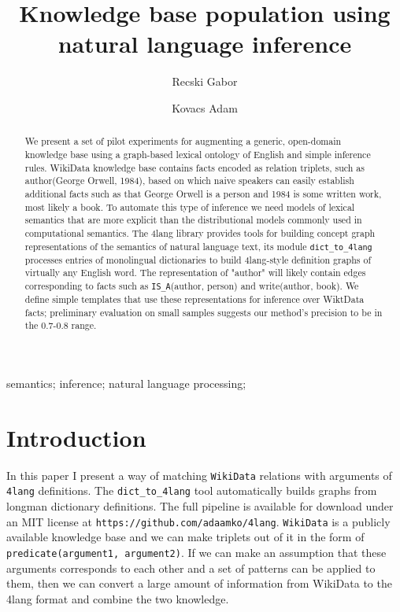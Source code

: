 \documentclass[twoside,b5paper,10pt]{article}
\title{Knowledge base population using natural language inference }
\author{Recski Gabor \and Kovacs Adam}
\begin{document}
\makeAutStyleTitle


\begin{abstract}
  We present a set of pilot experiments for augmenting a generic, open-domain 
  knowledge base using a graph-based lexical ontology of English and simple
  inference rules. WikiData knowledge base contains facts encoded as relation
  triplets, such as author(George Orwell, 1984), based on which naive
  speakers can easily establish additional facts such as that George Orwell is a
  person and 1984 is some written work, most likely a book. To automate this type
  of inference we need models of lexical semantics that are more explicit than
  the distributional models commonly used in computational semantics. The 4lang
  library provides tools for building concept graph representations of the
  semantics of natural language text, its module \verb|dict_to_4lang| processes entries
  of monolingual dictionaries to build 4lang-style definition graphs of virtually
  any English word. The representation of "author" will likely contain edges
  corresponding to facts such as \verb|IS_A|(author, person) and write(author, book).
  We define simple templates that use these representations for inference over
  WiktData facts; preliminary evaluation on small samples suggests our method's
  precision to be in the $0.7$-$0.8$ range.
\end{abstract}


\begin{keywords}
semantics; inference; natural language processing;
\end{keywords}

\section{Introduction}
\label{sec:Introdu}

In this paper I present a way of matching \verb|WikiData| relations with arguments of 
\verb|4lang| definitions. The \verb|dict_to_4lang| tool automatically builds graphs from longman dictionary definitions. 
The full pipeline is available for download under an MIT license at \verb|https://github.com/adaamko/4lang|.
\verb|WikiData| is a publicly available knowledge base and we can make triplets out of it in the form of \verb|predicate(argument1, argument2)|. 
If we can make an assumption that these arguments corresponds to each other and a set of patterns can be applied to them, then we can  convert a large amount of information from WikiData to the 4lang format and combine the two knowledge.
\end{document}
